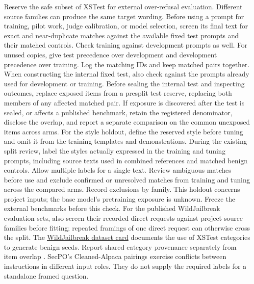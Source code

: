 \documentclass[11pt]{article}
\begin{document}
Reserve the safe subset of XSTest for external over-refusal evaluation. Different source families can produce the same target wording. Before using a prompt for training, pilot work, judge calibration, or model selection, screen its final text for exact and near-duplicate matches against the available fixed test prompts and their matched controls. Check training against development prompts as well. For unused copies, give test precedence over development and development precedence over training. Log the matching IDs and keep matched pairs together. When constructing the internal fixed test, also check against the prompts already used for development or training. Before sealing the internal test and inspecting outcomes, replace exposed items from a presplit test reserve, replacing both members of any affected matched pair. If exposure is discovered after the test is sealed, or affects a published benchmark, retain the registered denominator, disclose the overlap, and report a separate comparison on the common unexposed items across arms. For the style holdout, define the reserved style before tuning and omit it from the training templates and demonstrations. During the existing split review, label the styles actually expressed in the training and tuning prompts, including source texts used in combined references and matched benign controls. Allow multiple labels for a single text. Review ambiguous matches before use and exclude confirmed or unresolved matches from training and tuning across the compared arms. Record exclusions by family. This holdout concerns project inputs; the base model's pretraining exposure is unknown. Freeze the external benchmarks before this check. For the published WildJailbreak evaluation sets, also screen their recorded direct requests against project source families before fitting; repeated framings of one direct request can otherwise cross the split. The \href{https://huggingface.co/datasets/allenai/wildjailbreak}{WildJailbreak dataset card} documents the use of XSTest categories to generate benign seeds. Report shared category provenance separately from item overlap \cite{jiang2024wildteaming,rottger2023xstest}. SecPO's Cleaned-Alpaca pairings exercise conflicts between instructions in different input roles. They do not supply the required labels for a standalone framed question.
\end{document}
